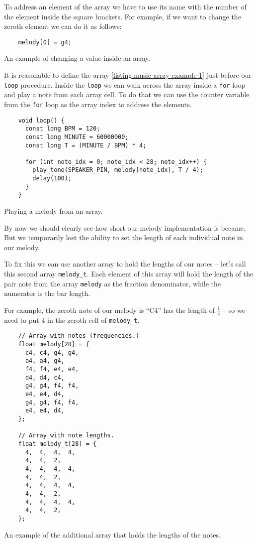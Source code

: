 \documentclass[../sparc.tex]{subfiles}
\begin{document}
To address an element of the array we have to use its name with the number of
the element inside the square brackets.  For example, if we want to change the
zeroth element we can do it as follows:

\begin{listing}[ht]
  \begin{verbatim}
    melody[0] = g4;
  \end{verbatim}
  \label{listing:music-array-example-2}
  \caption{An example of changing a value inside an array.}
\end{listing}

It is reasonable to define the array \ref{listing:music-array-example-1} just
before our \texttt{loop} procedure.  Inside the \texttt{loop} we can walk across
the array inside a \texttt{for} loop and play a note from each array cell.  To
do that we can use the counter variable from the \texttt{for} loop as the array
index to address the elements.


\begin{listing}[ht]
  \begin{verbatim}
    void loop() {
      const long BPM = 120;
      const long MINUTE = 60000000;
      const long T = (MINUTE / BPM) * 4;

      for (int note_idx = 0; note_idx < 28; note_idx++) {
        play_tone(SPEAKER_PIN, melody[note_idx], T / 4);
        delay(100);
      }
    }
  \end{verbatim}
  \label{listing:music-array-example-3}
  \caption{Playing a melody from an array.}
\end{listing}

By now we should clearly see how short our melody implementation is became.  But
we temporarily lost the ability to set the length of each individual note in our
melody.

To fix this we can use another array to hold the lengths of our notes -- let's
call this second array \texttt{melody\_t}.  Each element of this array will hold
the length of the pair note from the array \texttt{melody} as the fraction
denominator, while the numerator is the bar length.

For example, the zeroth note of our melody is ``C4'' has the length of
$\frac{1}{4}$ -- so we need to put 4 in the zeroth cell of \texttt{melody\_t}.

\begin{listing}[H]
  \begin{verbatim}
    // Array with notes (frequencies.)
    float melody[28] = {
      c4, c4, g4, g4,
      a4, a4, g4,
      f4, f4, e4, e4,
      d4, d4, c4,
      g4, g4, f4, f4,
      e4, e4, d4,
      g4, g4, f4, f4,
      e4, e4, d4,
    };

    // Array with note lengths.
    float melody_t[28] = {
      4,  4,  4,  4,
      4,  4,  2,
      4,  4,  4,  4,
      4,  4,  2,
      4,  4,  4,  4,
      4,  4,  2,
      4,  4,  4,  4,
      4,  4,  2,
    };
  \end{verbatim}
  \label{listing:music-array-example-4}
  \caption{An example of the additional array that holds the lengths of the
    notes.}
\end{listing}
\end{document}
